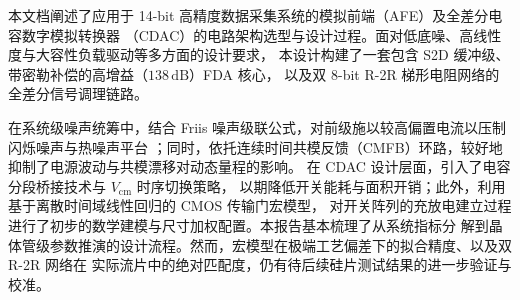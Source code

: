 	
\begin{chineseabstract}
本文档阐述了应用于 14-bit 高精度数据采集系统的模拟前端（AFE）及全差分电容数字模拟转换器
（CDAC）的电路架构选型与设计过程。面对低底噪、高线性度与大容性负载驱动等多方面的设计要求，
本设计构建了一套包含 S2D 缓冲级、带密勒补偿的高增益（$138\,\mathrm{dB}$）FDA 核心，
以及双 8-bit R-2R 梯形电阻网络的全差分信号调理链路。

在系统级噪声统筹中，结合 Friis 噪声级联公式，对前级施以较高偏置电流以压制闪烁噪声与热噪声平台
；同时，依托连续时间共模反馈（CMFB）环路，较好地抑制了电源波动与共模漂移对动态量程的影响。
在 CDAC 设计层面，引入了电容分段桥接技术与 $V_{\mathrm{cm}}$ 时序切换策略，
以期降低开关能耗与面积开销；此外，利用基于离散时间域线性回归的 CMOS 传输门宏模型，
对开关阵列的充放电建立过程进行了初步的数学建模与尺寸加权配置。本报告基本梳理了从系统指标分
解到晶体管级参数推演的设计流程。然而，宏模型在极端工艺偏差下的拟合精度、以及双 R-2R 网络在
实际流片中的绝对匹配度，仍有待后续硅片测试结果的进一步验证与校准。

\end{chineseabstract}


